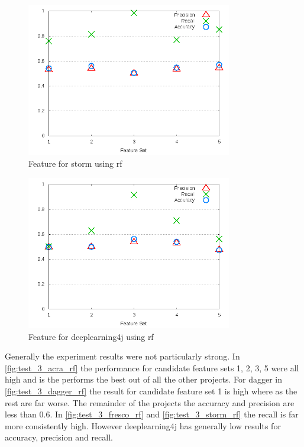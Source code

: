 \begin{figure}[!ht]
    \centering
        \includegraphics[width=0.8\textwidth]{images/rf/test_3/storm_sample_range}
        \caption{Feature for storm using \gls{rf}}
        \label{fig:test_3_storm_rf}
\end{figure}

\begin{figure}[!ht]
    \centering
        \includegraphics[width=0.8\textwidth]{images/rf/test_3/deeplearning4j_sample_range}
    \caption{Feature for deeplearning4j using \gls{rf}}
    \label{fig:test_3_deeplearning4j_rf}
\end{figure}

Generally the experiment results were not particularly strong. In \autoref{fig:test_3_acra_rf} the performance for candidate feature sets 1, 2, 3, 5 were all high and is the performs the best out of all the other projects. For dagger in \autoref{fig:test_3_dagger_rf} the result for candidate feature set 1 is high where as the rest are far worse. The remainder of the projects the accuracy and precision are less than $0.6$. In \autoref{fig:test_3_fresco_rf} and \autoref{fig:test_3_storm_rf} the recall is far more consistently high. However deeplearning4j has generally low results for accuracy, precision and recall.

